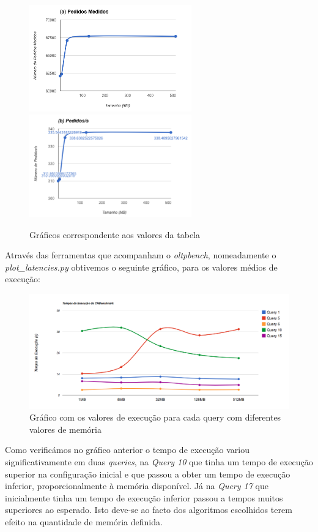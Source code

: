 \begin{figure}[ht!]
\centering
\includegraphics[width=70mm]{img/06_wm_a.png}
\includegraphics[width=70mm]{img/06_wm_b.png}
\caption{Gráficos correspondente aos valores da tabela \label{overflow}}
\end{figure}

Através das ferramentas que acompanham o \textit{oltpbench}, nomeadamente o \textit{plot\_latencies.py} obtivemos o seguinte gráfico, para os valores médios de execução:

\begin{figure}[ht!]
\centering
\includegraphics[width=\textwidth]{img/06_wm_c.png}
\caption{Gráfico com os valores de execução para cada query com diferentes valores de memória\label{overflow}}
\end{figure}

Como verificámos no gráfico anterior o tempo de execução variou significativamente em duas \textit{queries}, na \textit{Query 10} que tinha um tempo de execução superior na configuração inicial e que passou a obter um tempo de execução inferior, proporcionalmente à memória disponível. Já na \textit{Query 17} que inicialmente tinha um tempo de execução inferior passou a tempos muitos superiores ao esperado. Isto deve-se ao facto dos algoritmos escolhidos terem efeito na quantidade de memória definida.

